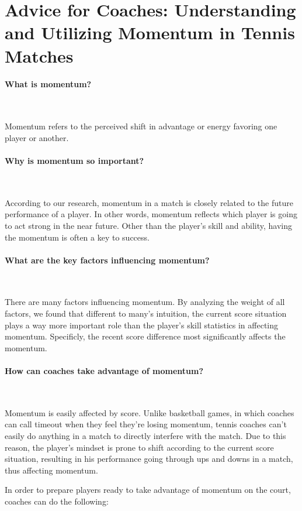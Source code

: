 \section{Advice for Coaches: Understanding and Utilizing Momentum in Tennis Matches}

\paragraph{What is momentum?}~{}

Momentum refers to the perceived shift in advantage or energy favoring one player or another. 

\paragraph{Why is momentum so important?}~{}

According to our research, momentum in a match is closely related to the future performance of a player. In other words, momentum reflects which player is going to act strong in the near future. Other than the player's skill and ability, having the momentum is often a key to success.

\paragraph{What are the key factors influencing momentum?}~{}

There are many factors influencing momentum. By analyzing the weight of all factors, we found that different to many's intuition, the current score situation plays a way more important role than the player's skill statistics in affecting momentum. Specificly, the recent score difference most significantly affects the momentum.

\paragraph{How can coaches take advantage of momentum?}~{}

Momentum is easily affected by score. Unlike basketball games, in which coaches can call timeout when they feel they're losing momentum, tennis coaches can't easily do anything in a match to directly interfere with the match. Due to this reason, the player's mindset is prone to shift according to the current score situation, resulting in his performance going through ups and downs in a match, thus affecting momentum.

\par In order to prepare players ready to take advantage of momentum on the court, coaches can do the following:


